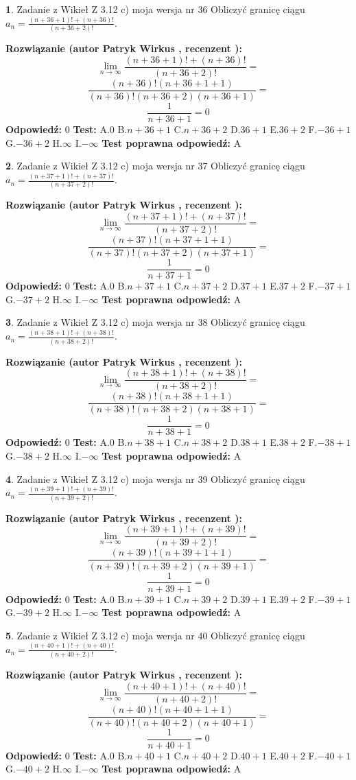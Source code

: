 \documentclass[12pt, a4paper]{article}
\theoremstyle{definition} %
\newtheorem{zad}{}
\newcommand{\zadStart}[1]{\begin{zad}#1\newline}
\newcommand{\zadStop}{\end{zad}}
\newcommand{\rozwStart}[2]{\noindent \textbf{Rozwiązanie (autor #1 , recenzent #2): }\newline}
\newcommand{\rozwStop}{\newline}
\newcommand{\odpStart}{\noindent \textbf{Odpowiedź:}\newline}
\newcommand{\odpStop}{\newline}
\newcommand{\testStart}{\noindent \textbf{Test:}\newline}
\newcommand{\testStop}{\newline}
\newcommand{\kluczStart}{\noindent \textbf{Test poprawna odpowiedź:}\newline}
\newcommand{\kluczStop}{\newline}
\begin{document}
\zadStart{Zadanie z Wikieł Z 3.12 c) moja wersja nr 36}
Obliczyć granicę ciągu $a_{n}=\frac{(n+36+1)!+(n+36)!}{(n+36+2)!}$.
\zadStop
\rozwStart{Patryk Wirkus}{}
$$\lim\limits_{n\to\infty}\frac{(n+36+1)!+(n+36)!}{(n+36+2)!}=$$
$$\frac{(n+36)!(n+36+1+1)}{(n+36)!(n+36+2)(n+36+1)}=$$
$$\frac{1}{n+36+1}= 0$$
\rozwStop
\odpStart
$0$
\odpStop
\testStart
A.$0$
B.$n+36+1$
C.$n+36+2$
D.$36+1$
E.$36+2$
F.$-36+1$
G.$-36+2$
H.$\infty$
I.$-\infty$
\testStop
\kluczStart
A
\kluczStop



\zadStart{Zadanie z Wikieł Z 3.12 c) moja wersja nr 37}
Obliczyć granicę ciągu $a_{n}=\frac{(n+37+1)!+(n+37)!}{(n+37+2)!}$.
\zadStop
\rozwStart{Patryk Wirkus}{}
$$\lim\limits_{n\to\infty}\frac{(n+37+1)!+(n+37)!}{(n+37+2)!}=$$
$$\frac{(n+37)!(n+37+1+1)}{(n+37)!(n+37+2)(n+37+1)}=$$
$$\frac{1}{n+37+1}= 0$$
\rozwStop
\odpStart
$0$
\odpStop
\testStart
A.$0$
B.$n+37+1$
C.$n+37+2$
D.$37+1$
E.$37+2$
F.$-37+1$
G.$-37+2$
H.$\infty$
I.$-\infty$
\testStop
\kluczStart
A
\kluczStop



\zadStart{Zadanie z Wikieł Z 3.12 c) moja wersja nr 38}
Obliczyć granicę ciągu $a_{n}=\frac{(n+38+1)!+(n+38)!}{(n+38+2)!}$.
\zadStop
\rozwStart{Patryk Wirkus}{}
$$\lim\limits_{n\to\infty}\frac{(n+38+1)!+(n+38)!}{(n+38+2)!}=$$
$$\frac{(n+38)!(n+38+1+1)}{(n+38)!(n+38+2)(n+38+1)}=$$
$$\frac{1}{n+38+1}= 0$$
\rozwStop
\odpStart
$0$
\odpStop
\testStart
A.$0$
B.$n+38+1$
C.$n+38+2$
D.$38+1$
E.$38+2$
F.$-38+1$
G.$-38+2$
H.$\infty$
I.$-\infty$
\testStop
\kluczStart
A
\kluczStop



\zadStart{Zadanie z Wikieł Z 3.12 c) moja wersja nr 39}
Obliczyć granicę ciągu $a_{n}=\frac{(n+39+1)!+(n+39)!}{(n+39+2)!}$.
\zadStop
\rozwStart{Patryk Wirkus}{}
$$\lim\limits_{n\to\infty}\frac{(n+39+1)!+(n+39)!}{(n+39+2)!}=$$
$$\frac{(n+39)!(n+39+1+1)}{(n+39)!(n+39+2)(n+39+1)}=$$
$$\frac{1}{n+39+1}= 0$$
\rozwStop
\odpStart
$0$
\odpStop
\testStart
A.$0$
B.$n+39+1$
C.$n+39+2$
D.$39+1$
E.$39+2$
F.$-39+1$
G.$-39+2$
H.$\infty$
I.$-\infty$
\testStop
\kluczStart
A
\kluczStop



\zadStart{Zadanie z Wikieł Z 3.12 c) moja wersja nr 40}
Obliczyć granicę ciągu $a_{n}=\frac{(n+40+1)!+(n+40)!}{(n+40+2)!}$.
\zadStop
\rozwStart{Patryk Wirkus}{}
$$\lim\limits_{n\to\infty}\frac{(n+40+1)!+(n+40)!}{(n+40+2)!}=$$
$$\frac{(n+40)!(n+40+1+1)}{(n+40)!(n+40+2)(n+40+1)}=$$
$$\frac{1}{n+40+1}= 0$$
\rozwStop
\odpStart
$0$
\odpStop
\testStart
A.$0$
B.$n+40+1$
C.$n+40+2$
D.$40+1$
E.$40+2$
F.$-40+1$
G.$-40+2$
H.$\infty$
I.$-\infty$
\testStop
\kluczStart
A
\kluczStop
\end{document}
